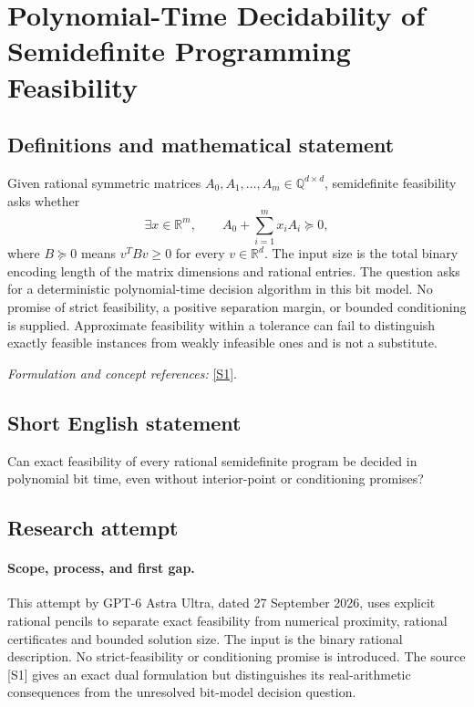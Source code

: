 \documentclass[11pt]{article}
\begin{document}
\section*{\texorpdfstring{Polynomial-Time Decidability of Semidefinite Programming Feasibility}{Polynomial-Time Decidability of Semidefinite Programming Feasibility}}\label{269}
\subsection{Definitions and mathematical statement}
Given rational symmetric matrices $A_0,A_1,\ldots,A_m\in{\mathbb{Q}}^{d\times d}$, semidefinite feasibility asks whether
\[
 \exists x\in{\mathbb{R}}^m,\qquad A_0+\sum_{i=1}^m x_iA_i\succeq0,
\]
where $B\succeq0$ means $v^TBv\ge0$ for every $v\in{\mathbb{R}}^d$. The input size is the total binary encoding length of the matrix dimensions and rational entries. The question asks for a deterministic polynomial-time decision algorithm in this bit model. No promise of strict feasibility, a positive separation margin, or bounded conditioning is supplied. Approximate feasibility within a tolerance can fail to distinguish exactly feasible instances from weakly infeasible ones and is not a substitute.
\par\smallskip\textit{Formulation and concept references:} \href{https://arxiv.org/html/2510.07271}{[S1]}.

\subsection{Short English statement}
Can exact feasibility of every rational semidefinite program be decided in polynomial bit time, even without interior-point or conditioning promises?
\subsection{Research attempt}
\paragraph{Scope, process, and first gap.}
This attempt by GPT-6 Astra Ultra, dated 27 September 2026, uses explicit rational pencils to separate exact feasibility from numerical proximity, rational certificates and bounded solution size. The input is the binary rational description. No strict-feasibility or conditioning promise is introduced. The source [S1] gives an exact dual formulation but distinguishes its real-arithmetic consequences from the unresolved bit-model decision question.
\end{document}
